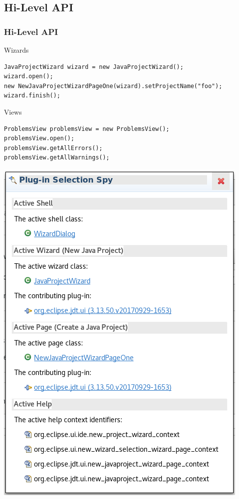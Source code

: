 \documentclass{beamer}
\begin{document}
\subsection{Hi-Level API}
\begin{frame}[fragile]
\frametitle{Hi-Level API}
\pause
Wizards
\begin{lstlisting}
JavaProjectWizard wizard = new JavaProjectWizard();
wizard.open();
new NewJavaProjectWizardPageOne(wizard).setProjectName("foo");
wizard.finish();
\end{lstlisting}
\vspace{0.5cm}
\pause
Views
\begin{lstlisting}
ProblemsView problemsView = new ProblemsView();
problemsView.open();
problemsView.getAllErrors();
problemsView.getAllWarnings();
\end{lstlisting}
\end{frame}

\begin{frame}[fragile]
\begin{center}
\includegraphics[width=\textwidth,height=0.8\textheight,keepaspectratio]{plugin_spy.png}
\end{center}
\end{frame}
\end{document}
